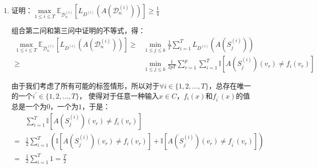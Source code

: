 \documentclass[12pt, a4paper]{article}
\newcommand{\under}[1]{\mathop{#1}\limits_}
\newcommand{\expect}{{\mathbb{E}}}
\newcommand{\unit}{{\mathbb{I}}}
\newcommand{\DD}{{\mathcal{D}}}
\begin{document}
\begin{enumerate}
        由于$p \ge n$，我们有：
        \begin{align*}
        &\frac{1}{T} \sum_{i = 1}^{T} L_{D^{(i)}}(A(S_j^{(i)})) - \frac{1}{2 p T} \sum_{r = 1}^{p} \sum_{i = 1}^{T} \unit[A(S_j^{(i)})(v_r) \ne f_i(v_r)] \\
        =& \frac{1}{T} \sum_{i = 1}^{T} (L_{D^{(i)}}(A(S_j^{(i)})) - \frac{1}{2p} \sum_{r = 1}^{p} \unit[A(S_j^{(i)})(v_r) \ne f_i(v_r)]) \\
        =& \frac{1}{T} \sum_{i = 1}^{T} (\frac{1}{2 n} \sum_{s = 1}^{2n} \unit[A(S_j^{(i)})(x_s) \ne f_i(x_s)] - \frac{1}{2p} \sum_{r = 1}^{p} \unit[A(S_j^{(i)})(v_r) \ne f_i(v_r)]) \\
        \ge& \frac{1}{T} \sum_{i = 1}^{T} ((\frac{1}{2 n} - \frac{1}{2 p}) \sum_{r = 1}^{p} \unit[A(S_j^{(i)})(v_r) \ne f_i(v_r)]) \ge 0
        \end{align*}

        因此：
        \begin{align*}
        \frac{1}{T} \sum_{i = 1}^{T} L_{D^{(i)}}(A(S_j^{(i)})) \ge \frac{1}{2 p T} \sum_{r = 1}^{p} \sum_{i = 1}^{T} \unit[A(S_j^{(i)})(v_r) \ne f_i(v_r)]
        \end{align*}

    \item 证明：$\under{\max}{1 \le i \le T} \expect_{\DD_n^{(i)}}[L_{D^{(i)}}(A(\DD_n^{(i)}))] \ge \frac{1}{4}$

        组合第二问和第三问中证明的不等式，得：
        \begin{align*}
        \under{\max}{1 \le i \le T} \expect_{\DD_n^{(i)}}[L_{D^{(i)}}(A(\DD_n^{(i)}))]
        \ge& \under{\min}{1 \le j \le k} \frac{1}{T} \sum_{i = 1}^{T} L_{D^{(i)}}(A(S_j^{(i)})) \\
        \ge& \under{\min}{1 \le j \le k} \frac{1}{2 p T} \sum_{r = 1}^{p} \sum_{i = 1}^{T} \unit[A(S_j^{(i)})(v_r) \ne f_i(v_r)]
        \end{align*}

        由于我们考虑了所有可能的标签情形，所以对于$\forall i \in \{1, 2, ..., T\}$，总存在唯一的一个$i^\prime \in \{1, 2, ..., T\}$，
        使得对于任意一种输入$x \in C$，$f_i(x)$和$f_{i^\prime}(x)$的值总是一个为$0$，一个为$1$，于是：
        \begin{align*}
        &\sum_{i = 1}^{T} \unit[A(S_j^{(i)})(v_r) \ne f_i(v_r)] \\
        =& \frac{1}{2} \sum_{i = 1}^{T} (\unit[A(S_j^{(i)})(v_r) \ne f_i(v_r)] + \unit[A(S_j^{(i)})(v_r) \ne f_{i^\prime}(v_r)]) \\
        =& \frac{1}{2} \sum_{i = 1}^{T} 1 = \frac{T}{2}
        \end{align*}


\end{enumerate}
\end{document}
